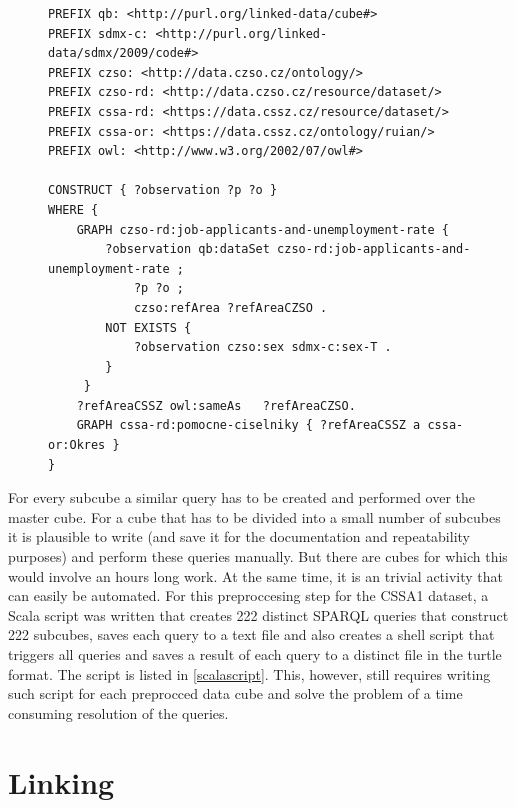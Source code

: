 \begin{figure}[h]
\begin{lstlisting}[language = SPARQL, caption={SPARQL query to create a subcube (Source: author)}, label={sparqlcutexample},captionpos=b escapeinside={(*@}{@*)}]
PREFIX qb: <http://purl.org/linked-data/cube#>
PREFIX sdmx-c: <http://purl.org/linked-data/sdmx/2009/code#>
PREFIX czso: <http://data.czso.cz/ontology/>
PREFIX czso-rd: <http://data.czso.cz/resource/dataset/>
PREFIX cssa-rd: <https://data.cssz.cz/resource/dataset/>
PREFIX cssa-or: <https://data.cssz.cz/ontology/ruian/>
PREFIX owl: <http://www.w3.org/2002/07/owl#>
    
CONSTRUCT { ?observation ?p ?o } 
WHERE { 
    GRAPH czso-rd:job-applicants-and-unemployment-rate {
        ?observation qb:dataSet czso-rd:job-applicants-and-unemployment-rate ;
            ?p ?o ;
            czso:refArea ?refAreaCZSO .
        NOT EXISTS {
            ?observation czso:sex sdmx-c:sex-T .
        }             
     }
    ?refAreaCSSZ owl:sameAs   ?refAreaCZSO.
    GRAPH cssa-rd:pomocne-ciselniky { ?refAreaCSSZ a cssa-or:Okres }
}
\end{lstlisting}
\end{figure}

For every subcube a similar query has to be created and performed over the master cube. For a cube that has to be divided into a small number of subcubes it is plausible to write (and save it for the documentation and repeatability purposes) and perform these queries manually. But there are cubes for which this would involve an hours long work. At the same time, it is an trivial activity that can easily be automated. For this preproccesing step for the CSSA1 dataset, a Scala script was written that creates 222 distinct SPARQL queries that construct 222 subcubes, saves each query to a text file and also creates a shell script that triggers all queries and saves a result of each query to a distinct file in the turtle format. The script is listed in \ref{scalascript}. This, however, still requires writing such script for each preprocced data cube and solve the problem of a time consuming resolution of the queries.




\section{Linking\label{linking}}

